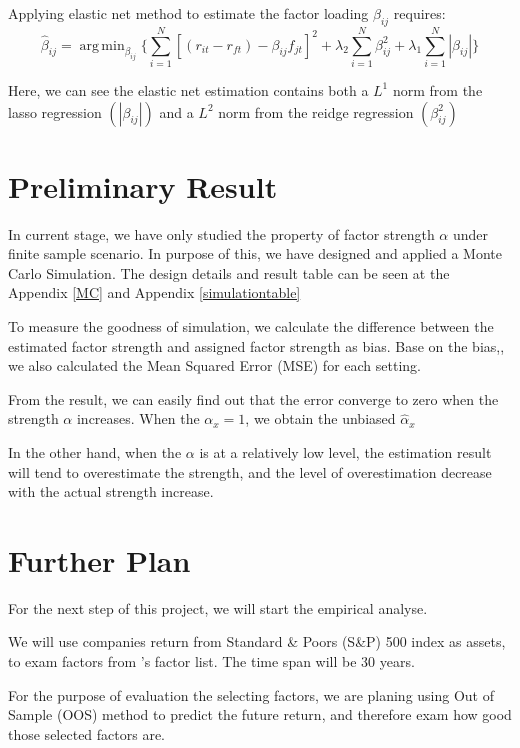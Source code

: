 \documentclass[12pt]{article}
\DeclareMathOperator*{\argmin}{arg\,min}
\begin{document}
Applying elastic net method to estimate the factor loading $\beta_{ij}$ requires:
	\[   \hat{\beta}_{ij}  = \argmin_{\beta_{ij}}\{\sum_{i = 1}^{N}[(r_{it} - r_{ft}) - \beta_{ij }f_{jt}]^2 + \lambda_2\sum_{i = 1}^{N}\beta_{ij}^2  + \lambda_1\sum_{i = 1}^{N}|\beta_{ij}|  \label{ENcriterion} \tag{4}   \}    \]

Here, we can see the elastic net estimation contains both a $L^1$ norm from the lasso regression $(|\beta_{ij}|)$ and a $L^2$ norm from the reidge regression $(\beta_{ij}^2)$








\section{Preliminary Result}
In current stage, we have only studied the property of factor strength $\alpha$ under finite sample scenario.
In purpose of this, we have designed and applied a Monte Carlo Simulation.
The design details and result table can be seen at the Appendix \ref{MC} and Appendix \ref{simulationtable} 

To measure the goodness of simulation, we calculate the difference between the estimated factor strength and assigned factor strength as bias.
Base on the bias,, we also calculated the Mean Squared Error (MSE) for each setting.

From the result, we can easily find out that the error converge to zero when the strength $\alpha$ increases. 
When the $\alpha _x= 1$, we obtain the unbiased $\hat{\alpha}_{x}$

In the other hand, when the $\alpha$ is at a relatively low level, the estimation result will tend to overestimate the strength, and the level of overestimation decrease with the actual strength increase.

			\section{Further Plan}
For the next step of this project, we will start the empirical analyse. 

We will use companies return from Standard \& Poors (S\&P) 500 index as assets, to exam factors from 's factor list. 
The time span will be 30 years. 

For the purpose of evaluation the selecting factors, we are planing using Out of Sample (OOS) method to predict the future return, and therefore exam how good those selected factors are. 


\newpage



\newpage
\appendix


\end{document}
